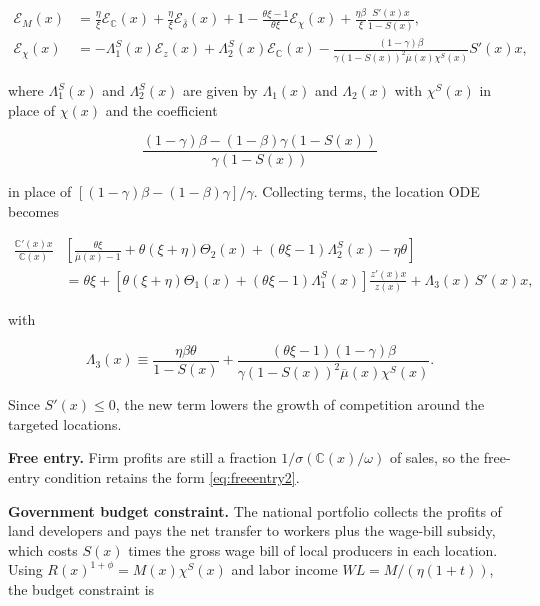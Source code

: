 \begin{align*}
	\mathcal{E}_{M}(x) & = \frac{\eta}{\xi} \mathcal{E}_\mathbb{C}(x) +  \frac{\eta}{\xi} \mathcal{E}_{\overline{\delta}}(x) + 1 - \frac{\theta\xi - 1}{\theta\xi} \mathcal{E}_{\chi}(x) + \frac{\eta\beta}{\xi}\frac{S'(x)x}{1-S(x)}, \\
	\mathcal{E}_{\chi}(x) & = -\Lambda^S_1\left(x\right)\mathcal{E}_z(x) + \Lambda^S_2 \left(x\right)\mathcal{E}_\mathbb{C}(x) - \frac{(1-\gamma)\beta}{\gamma (1-S(x))^2 \overline{\mu}(x) \chi^S(x)} S'(x)x,
\end{align*}

where $\Lambda^S_1(x)$ and $\Lambda^S_2(x)$ are given by $\Lambda_1(x)$ and $\Lambda_2(x)$ with $\chi^S(x)$ in place of $\chi(x)$ and the coefficient

\begin{equation*}
	\frac{(1-\gamma)\beta - (1-\beta)\gamma(1-S(x))}{\gamma(1-S(x))}
\end{equation*}

in place of $[(1-\gamma)\beta - (1-\beta)\gamma]/\gamma$. Collecting terms, the location ODE becomes

\begin{align}
	\frac{\mathbb{C}'(x)x}{\mathbb{C}(x)} & \left[\frac{\theta\xi}{\overline{\mu}(x) -1 } + \theta(\xi + \eta)\Theta_2(x) + (\theta\xi - 1) 	\Lambda^S_2(x) -  \eta \theta \right] \nonumber \\
    & = \theta\xi + \left[\theta(\xi + \eta) \Theta_1(x) + (\theta\xi - 1) 	\Lambda^S_1(x) \right] \frac{z'(x)x}{z(x)} + \Lambda_3(x)\, S'(x)x, \label{eq:odeezext}
\end{align}

with

\begin{equation*}
	\Lambda_3(x) \equiv \frac{\eta\beta\theta}{1-S(x)} + \frac{(\theta\xi - 1)(1-\gamma)\beta}{\gamma (1-S(x))^2 \overline{\mu}(x) \chi^S(x)}.
\end{equation*}

Since $S'(x) \leq 0$, the new term lowers the growth of competition around the targeted locations.

\textbf{Free entry.} Firm profits are still a fraction $1/\sigma(\mathbb{C}(x)/\omega)$ of sales, so the free-entry condition retains the form \eqref{eq:freeentry2}.

\textbf{Government budget constraint.} The national portfolio collects the profits of land developers and pays the net transfer to workers plus the wage-bill subsidy, which costs $S(x)$ times the gross wage bill of local producers in each location. Using $R(x)^{1+\phi} = M(x)\chi^S(x)$ and labor income $WL = M/(\eta(1+t))$, the budget constraint is

